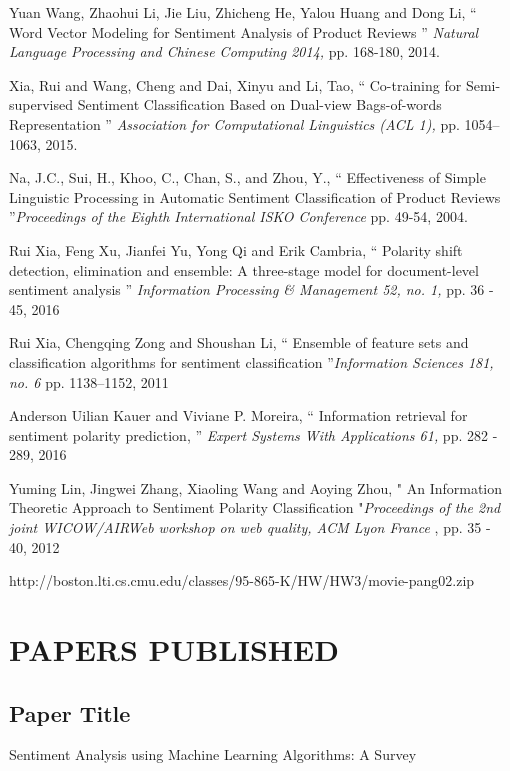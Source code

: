 \documentclass[oneside,a4paper,12pt]{pictreport}
\begin{document}
\begin{thebibliography}{20}
  Yuan Wang, Zhaohui Li, Jie Liu, Zhicheng He, Yalou Huang and Dong Li,
 `` Word Vector Modeling for Sentiment Analysis
of Product Reviews '' {\em Natural Language Processing and Chinese Computing 2014,} pp. 168-180, 2014.


Xia, Rui and Wang, Cheng and Dai, Xinyu and Li, Tao, 
`` Co-training for Semi-supervised Sentiment Classification Based on Dual-view Bags-of-words Representation ''
  {\em Association for Computational Linguistics (ACL 1),} pp. 1054–1063, 2015.
  
Na, J.C., Sui, H., Khoo, C., Chan, S., and Zhou, Y., `` Effectiveness of Simple Linguistic Processing in Automatic 
Sentiment Classification of Product Reviews ''{\em Proceedings 
of the Eighth International ISKO Conference
 } pp. 49-54, 2004.
 
 Rui Xia, Feng Xu, Jianfei Yu, Yong Qi and Erik Cambria, `` Polarity shift detection, elimination and ensemble:
A three-stage model for document-level sentiment analysis '' {\em  Information Processing \& Management 52, no. 1, } pp. 36 - 45, 2016

Rui Xia, Chengqing Zong and Shoushan Li, `` Ensemble of feature sets and classification algorithms
for sentiment classification ''{\em  Information Sciences 181, no. 6 } pp. 1138–1152, 2011

Anderson Uilian Kauer and Viviane P. Moreira, `` Information retrieval for sentiment polarity prediction, ''
{\em Expert Systems With Applications 61,} pp. 282 - 289, 2016

Yuming Lin, Jingwei Zhang, Xiaoling Wang and Aoying Zhou, " An Information Theoretic Approach to Sentiment Polarity
Classification "{\em Proceedings of the 2nd joint WICOW/AIRWeb workshop on web quality, ACM Lyon France }, pp. 35 - 40, 2012

http://boston.lti.cs.cmu.edu/classes/95-865-K/HW/HW3/movie-pang02.zip
\end{thebibliography}

\appendix
\chapter{PAPERS PUBLISHED}
\section{Paper Title}
Sentiment Analysis using Machine Learning Algorithms: A Survey
\end{document}
